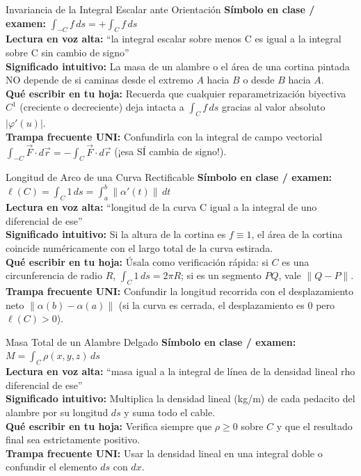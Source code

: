 \documentclass[11pt,a4paper]{article}
\begin{document}
\begin{definicionbox}{Invariancia de la Integral Escalar ante Orientación}
\textbf{Símbolo en clase / examen:} $\int_{-C} f\,ds = +\int_C f\,ds$\\[0.15cm]
\textbf{Lectura en voz alta:} ``la integral escalar sobre menos C es igual a la integral sobre C sin cambio de signo''\\[0.12cm]
\textbf{Significado intuitivo:} La masa de un alambre o el área de una cortina pintada NO depende de si caminas desde el extremo $A$ hacia $B$ o desde $B$ hacia $A$.\\[0.12cm]
\textbf{Qué escribir en tu hoja:} Recuerda que cualquier reparametrización biyectiva $C^1$ (creciente o decreciente) deja intacta a $\int_C f\,ds$ gracias al valor absoluto $|\varphi'(u)|$.\\[0.12cm]
\textbf{Trampa frecuente UNI:} Confundirla con la integral de campo vectorial $\int_{-C} \vec{F}\cdot d\vec{r} = -\int_C \vec{F}\cdot d\vec{r}$ (¡esa SÍ cambia de signo!).
\end{definicionbox}

\begin{definicionbox}{Longitud de Arco de una Curva Rectificable}
\textbf{Símbolo en clase / examen:} $\ell(C) = \int_C 1\,ds = \int_a^b \|\alpha'(t)\|\,dt$\\[0.15cm]
\textbf{Lectura en voz alta:} ``longitud de la curva C igual a la integral de uno diferencial de ese''\\[0.12cm]
\textbf{Significado intuitivo:} Si la altura de la cortina es $f \equiv 1$, el área de la cortina coincide numéricamente con el largo total de la curva estirada.\\[0.12cm]
\textbf{Qué escribir en tu hoja:} Úsala como verificación rápida: si $C$ es una circunferencia de radio $R$, $\int_C 1\,ds = 2\pi R$; si es un segmento $PQ$, vale $\|Q-P\|$.\\[0.12cm]
\textbf{Trampa frecuente UNI:} Confundir la longitud recorrida con el desplazamiento neto $\|\alpha(b)-\alpha(a)\|$ (si la curva es cerrada, el desplazamiento es $0$ pero $\ell(C) > 0$).
\end{definicionbox}

\begin{definicionbox}{Masa Total de un Alambre Delgado}
\textbf{Símbolo en clase / examen:} $M = \int_C \rho(x,y,z)\,ds$\\[0.15cm]
\textbf{Lectura en voz alta:} ``masa igual a la integral de línea de la densidad lineal rho diferencial de ese''\\[0.12cm]
\textbf{Significado intuitivo:} Multiplica la densidad lineal (kg/m) de cada pedacito del alambre por su longitud $ds$ y suma todo el cable.\\[0.12cm]
\textbf{Qué escribir en tu hoja:} Verifica siempre que $\rho \ge 0$ sobre $C$ y que el resultado final sea estrictamente positivo.\\[0.12cm]
\textbf{Trampa frecuente UNI:} Usar la densidad lineal en una integral doble o confundir el elemento $ds$ con $dx$.
\end{definicionbox}
\end{document}
